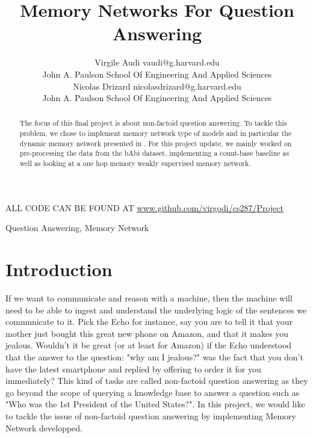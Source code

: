 \documentclass[twoside,11pt]{article}
\begin{document}
\title{Memory Networks For Question Answering}

\author{\name Virgile Audi \email vaudi@g.harvard.edu \\
       \addr  John A. Paulson School Of Engineering And Applied Sciences\\
       \AND
       \name Nicolas Drizard \email nicolasdrizard@g.harvard.edu \\
       \addr John A. Paulson School Of Engineering And Applied Sciences}


\maketitle
\begin{center}
ALL CODE CAN BE FOUND AT \url{www.github.com/virgodi/cs287/Project}
\end{center}
\vspace{2cm}
\begin{abstract}%
The focus of this final project is about non-factoid question answering. To tackle this problem, we chose to implement memory network type of models and in particular the dynamic memory network presented in \cite{dmn}. For this project update, we mainly worked on pre-processing the data from the bAbi dataset, implementing a count-base baseline as well as looking at a one hop memory weakly supervised memory network.
\end{abstract}

\begin{keywords}
  Question Answering, Memory Network
\end{keywords}
\vspace{2cm}
\section{Introduction}

If we want to communicate and reason with a machine, then the machine will need to be able to ingest and understand the underlying logic of the sentences we communicate to it. Pick the Echo for instance, say you are to tell it that your mother just bought this great new phone on Amazon, and that it makes you jealous. Wouldn't it be great (or at least for Amazon) if the Echo understood that the answer to the question: "why am I jealous?" was the fact that you don't have the latest smartphone and replied by offering to order it for you immediately? This kind of tasks are called non-factoid question answering as they go beyond the scope of querying a knowledge base to answer a question such as "Who was the 1st President of the United States?". In this project, we would like to tackle the issue of non-factoid question answering by implementing Memory Network developped.
\end{document}

